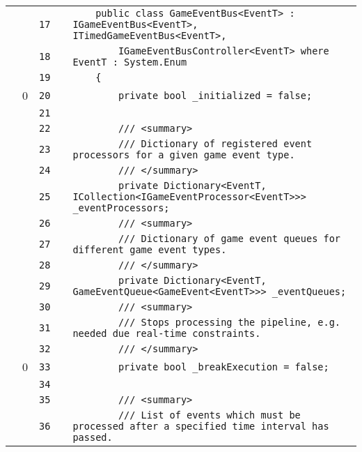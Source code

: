 \documentclass[a4paper,landscape,10pt]{article}
\begin{document}
\begin{longtable}[l]{lrrll}
\cellcolor{gray} &  & \verb~17~ & & \verb~    public class GameEventBus<EventT> : IGameEventBus<EventT>, ITimedGameEventBus<EventT>,~\\
\cellcolor{gray} &  & \verb~18~ & & \verb~        IGameEventBusController<EventT> where EventT : System.Enum~\\
\cellcolor{gray} &  & \verb~19~ & & \verb~    {~\\
\cellcolor{red} & 0 & \verb~20~ & & \verb~        private bool _initialized = false;~\\
\cellcolor{gray} &  & \verb~21~ & & \verb~~\\
\cellcolor{gray} &  & \verb~22~ & & \verb~        /// <summary>~\\
\cellcolor{gray} &  & \verb~23~ & & \verb~        /// Dictionary of registered event processors for a given game event type.~\\
\cellcolor{gray} &  & \verb~24~ & & \verb~        /// </summary>~\\
\cellcolor{gray} &  & \verb~25~ & & \verb~        private Dictionary<EventT, ICollection<IGameEventProcessor<EventT>>> _eventProcessors;~\\
\cellcolor{gray} &  & \verb~26~ & & \verb~        /// <summary>~\\
\cellcolor{gray} &  & \verb~27~ & & \verb~        /// Dictionary of game event queues for different game event types.~\\
\cellcolor{gray} &  & \verb~28~ & & \verb~        /// </summary>~\\
\cellcolor{gray} &  & \verb~29~ & & \verb~        private Dictionary<EventT, GameEventQueue<GameEvent<EventT>>> _eventQueues;~\\
\cellcolor{gray} &  & \verb~30~ & & \verb~        /// <summary>~\\
\cellcolor{gray} &  & \verb~31~ & & \verb~        /// Stops processing the pipeline, e.g. needed due real-time constraints.~\\
\cellcolor{gray} &  & \verb~32~ & & \verb~        /// </summary>~\\
\cellcolor{red} & 0 & \verb~33~ & & \verb~        private bool _breakExecution = false;~\\
\cellcolor{gray} &  & \verb~34~ & & \verb~~\\
\cellcolor{gray} &  & \verb~35~ & & \verb~        /// <summary>~\\
\cellcolor{gray} &  & \verb~36~ & & \verb~        /// List of events which must be processed after a specified time interval has passed.~\\

\end{longtable}
\end{document}
